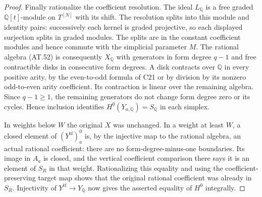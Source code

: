 \begin{proof}
Finally rationalize the coefficient resolution.
The ideal $L_{\mathbb Q}$ is a free graded
$\mathbb Q[t]$-module on $T^{[N]}$ with its shift.
The resolution splits into this module and identity
pairs: successively each kernel is graded projective,
so each displayed surjection splits in graded modules.
The splits are in the constant coefficient modules
and hence commute with the simplicial parameter $M$.
The rational algebra \textup{(AT.52)} is consequently
$X_{\mathbb Q}$ with generators in form degree
$q-1$ and free contractible disks in consecutive
form degrees.  A disk contracts over $\mathbb Q$
in every positive arity, by the even-to-odd formula
of C21 or by division by its nonzero odd-to-even
arity coefficient.  Its contraction is linear over
the remaining algebra.  Since $q-1\geq1$, the
remaining generators do not change form degree zero
or its cycles.  Hence inclusion identifies
$H^0(Y_{a,\mathbb Q})=S_{\mathbb Q}$ in each simplex.

In weights below $W$ the original $X$ was unchanged.
In a weight at least $W$, a closed element of
$(Y^{\mathrm{tf}})_a^0$ is, by the injective map to
the rational algebra, an actual rational coefficient:
there are no form-degree-minus-one boundaries.
Its image in $A_a$ is closed, and the vertical
coefficient comparison there says it is an element
of $S_R$ in that weight.  Rationalizing this equality
and using the coefficient-preserving target map
shows that the original rational coefficient was
already in $S_R$.
Injectivity of $Y^{\mathrm{tf}}\to Y_{\mathbb Q}$
now gives the asserted equality of $H^0$ integrally.
\end{proof}

